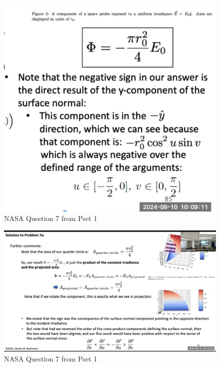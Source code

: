 \documentclass{article}
\begin{document}
\begin{figure}[h!]
\centering
\includegraphics[scale=.3]{Radiometry/Crux/Num5.png}
\caption{NASA Question 7 from Pset 1}
\label{fig:NASA Question}
\end{figure}

\begin{figure}[h!]
\centering
\includegraphics[scale=.4]{Radiometry/Crux/Num6.png}
\caption{NASA Question 7 from Pset 1}
\label{fig:NASA Question}
\end{figure}
\end{document}
